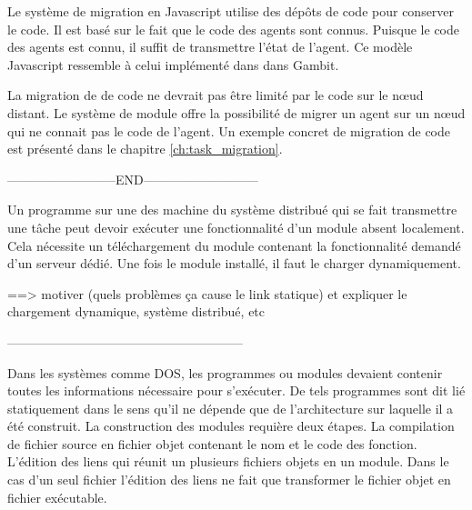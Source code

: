 Le système de migration en Javascript utilise des dépôts de code pour
conserver le code. Il est basé sur le fait que le code des agents
sont connus. Puisque le code des agents est connu, il suffit de transmettre
l'état de l'agent. Ce modèle Javascript ressemble à celui implémenté dans
dans Gambit.

La migration de de code ne devrait pas être limité par le code sur le nœud
distant. Le système de module offre la possibilité de migrer un agent sur un
nœud qui ne connait pas le code de l'agent. Un exemple concret de migration
de code est présenté dans le chapitre \ref{ch:task_migration}.




--------------------------END---------------------------

Un programme sur une des machine du système distribué qui se fait transmettre
une tâche peut devoir exécuter une fonctionnalité d'un module absent
localement. Cela nécessite un téléchargement du module contenant la
fonctionnalité demandé d'un serveur dédié. Une fois le module installé, il faut
le charger dynamiquement.

==> motiver (quels problèmes ça cause le link statique) et expliquer le chargement dynamique, système distribué, etc



--------------------------------------------------------


Dans les systèmes comme DOS, les programmes ou modules devaient contenir toutes les
informations nécessaire pour s'exécuter. De tels programmes sont dit lié
statiquement dans le sens qu'il ne dépende que de l'architecture sur laquelle il
a été construit. La construction des modules requière deux étapes. La compilation
de fichier source en fichier objet contenant le nom et le code des fonction.
L'édition des liens qui réunit un plusieurs fichiers objets en un module.
Dans le cas d'un seul fichier l'édition des liens ne fait que transformer le fichier
objet en fichier exécutable.

